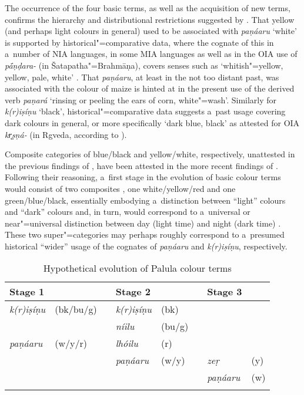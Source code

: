 The occurrence of the four basic terms, as well as the acquisition of new terms, confirms the hierarchy and distributional restrictions suggested by \citet[2--5]{berlinkay1969}. That yellow (and perhaps light colours in general) used to be associated with \textit{paṇáaru} `white' is supported by historical"=comparative data, where the cognate of this in a~number of NIA languages, in some MIA languages as well as in the OIA use of \textit{p\'{\={a}}ṇḍara-} (in Šatapatha"=Brahmāṇa), covers senses such as `whitish"=yellow, yellow, pale, white' \citep[8047]{turner1966}. That \textit{paṇáaru}, at least in the not too distant past, was associated with the colour of maize is hinted at in the present use of the derived verb \textit{paṇará} `rinsing or peeling the ears of corn, white"=wash'. Similarly for \textit{k(r)iṣíṇu} `black', historical"=comparative data suggests a~past usage covering dark colours in general, or more specifically `dark blue, black' as attested for OIA \textit{kr̥ṣṇá-} (in Rgveda, according to \citealt[3451]{turner1966}). 



Composite categories of blue/black and yellow/white, respectively, unattested in the previous findings of \citet{berlinkay1969}, have been attested in the more recent findings of \citet[17]{kayetal1991}. Following their reasoning, a~first stage in the evolution of basic colour terms would consist of two composites \citep[19]{kayetal1991}, one white/yellow/red and one green/blue/black, essentially embodying a~distinction between ``light'' colours and ``dark'' colours and, in turn, would correspond to a~universal or near"=universal distinction between day (light time) and night (dark time) \citep[288]{wierzbicka1996}. These two super"=categories may perhaps roughly correspond to a~presumed historical ``wider'' usage of the cognates of \textit{paṇáaru} and \textit{k(r)iṣíṇu}, respectively. 



\begin{table}[ht]
\caption{Hypothetical evolution of Palula colour terms}
\begin{tabularx}{\textwidth}{ Q Q l Q Q l Q Q }
\lsptoprule
Stage 1 &
&
&
Stage 2 &
&
&
Stage 3 &
\\\hline
\textit{k(r)iṣíṇu} &
(bk/bu/g) &
 &
\textit{k(r)iṣíṇu} &
(bk) &
&
&
\\
&
&
 &
\textit{níilu} &
(bu/g) &
&
&
\\
\textit{paṇáaru} &
(w/y/r) &
&
\textit{lhóilu} &
(r) &
&
&
\\
&
&
&
\textit{paṇáaru} &
(w/y) &
&
\textit{zeṛ} &
(y)\\
&
&
&
&
&
&
\textit{paṇáaru} &
(w)\\\lspbottomrule
\end{tabularx}
\label{tab:6-1}
\end{table}


